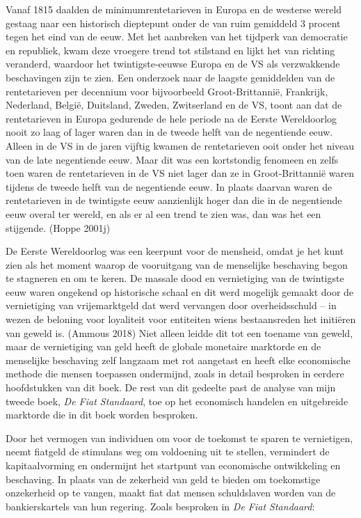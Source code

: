\documentclass[
  a5paper,
  smalldemyvopaper,11pt,twoside,onecolumn,openright,extrafontsizes,
hidelinks]{memoir}
\begin{document}
Vanaf 1815 daalden de minimumrentetarieven in Europa en de westerse
wereld gestaag naar een historisch dieptepunt onder de van ruim
gemiddeld 3 procent tegen het eind van de eeuw. Met het aanbreken van
het tijdperk van democratie en republiek, kwam deze vroegere trend tot
stilstand en lijkt het van richting veranderd, waardoor het
twintigste-eeuwse Europa en de VS als verzwakkende beschavingen zijn te
zien. Een onderzoek naar de laagste gemiddelden van de rentetarieven per
decennium voor bijvoorbeeld Groot-Brittannië, Frankrijk, Nederland,
België, Duitsland, Zweden, Zwitserland en de VS, toont aan dat de
rentetarieven in Europa gedurende de hele periode na de Eerste
Wereldoorlog nooit zo laag of lager waren dan in de tweede helft van de
negentiende eeuw. Alleen in de VS in de jaren vijftig kwamen de
rentetarieven ooit onder het niveau van de late negentiende eeuw. Maar
dit was een kortstondig fenomeen en zelfs toen waren de rentetarieven in
de VS niet lager dan ze in Groot-Brittannië waren tijdens de tweede
helft van de negentiende eeuw. In plaats daarvan waren de rentetarieven
in de twintigste eeuw aanzienlijk hoger dan die in de negentiende eeuw
overal ter wereld, en als er al een trend te zien was, dan was het een
stijgende. (Hoppe 2001j)

De Eerste Wereldoorlog was een keerpunt voor de mensheid, omdat je het
kunt zien als het moment waarop de vooruitgang van de menselijke
beschaving begon te stagneren en om te keren. De massale dood en
vernietiging van de twintigste eeuw waren ongekend op historische schaal
en dit werd mogelijk gemaakt door de vernietiging van vrijemarktgeld dat
werd vervangen door overheidsschuld -- in wezen de beloning voor
loyaliteit voor entiteiten wiens bestaansreden het initiëren van geweld
is. (Ammous 2018) Niet alleen leidde dit tot een toename van geweld,
maar de vernietiging van geld heeft de globale monetaire marktorde en de
menselijke beschaving zelf langzaam met rot aangetast en heeft elke
economische methode die mensen toepassen ondermijnd, zoals in detail
besproken in eerdere hoofdstukken van dit boek. De rest van dit gedeelte
past de analyse van mijn tweede boek, \emph{De Fiat Standaard}, toe op
het economisch handelen en uitgebreide marktorde die in dit boek worden
besproken.

Door het vermogen van individuen om voor de toekomst te sparen te
vernietigen, neemt fiatgeld de stimulans weg om voldoening uit te
stellen, vermindert de kapitaalvorming en ondermijnt het startpunt van
economische ontwikkeling en beschaving. In plaats van de zekerheid van
geld te bieden om toekomstige onzekerheid op te vangen, maakt fiat dat
mensen schuldslaven worden van de bankierskartels van hun regering.
Zoals besproken in \emph{De Fiat Standaard}:
\end{document}
